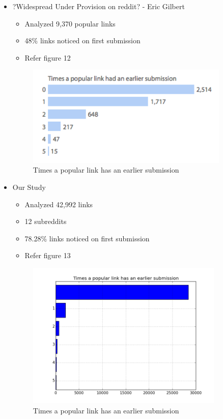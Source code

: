 \documentclass{article} %
\begin{document}
\begin{itemize}
\item ?Widespread Under Provision on reddit? - Eric Gilbert
	\begin{itemize}
	\item Analyzed 9,370 popular links
	\item 48\% links noticed on first submission
	\item Refer figure 12
	\end{itemize}
	
	\begin{figure}[h]
	\begin{center}
	\includegraphics[width=3.8in]{eric.png}
	\caption{Times a popular link has an earlier submission}
	\end{center}
	\end{figure}
	
\item Our Study
	\begin{itemize}
	\item Analyzed 42,992 links
	\item 12 subreddits
	\item 78.28\% links noticed on first submission
	\item Refer figure 13
	\end{itemize}
	
	\begin{figure}[h]
	\begin{center}
	\includegraphics[width=3.7in]{count.png}
	\caption{Times a popular link has an earlier submission}
	\end{center}
	\end{figure}
\end{itemize}
\end{document}
